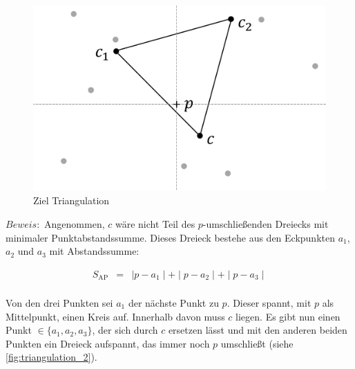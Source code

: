 \documentclass[a4paper]{extarticle}
\begin{document}
    \begin{figure}[!ht]
        \centering	
        \includegraphics[scale=0.10]{bilder/tri_1.pdf}
        \caption{Ziel Triangulation}
        \label{fig:triangulation_1}
    \end{figure}

    $Beweis:$
    Angenommen, $c$ wäre nicht Teil des $p$-umschließenden Dreiecks mit minimaler Punktabstandssumme.
    Dieses Dreieck bestehe aus den Eckpunkten $a_1$, $a_2$ und $a_3$ mit Abstandssumme:

    \begin{eqnarray*}
        S_{\text{AP}} &=& \mid p - a_1 \mid + \mid p - a_2 \mid + \mid p - a_3 \mid \\
    \end{eqnarray*}
    
    Von den drei Punkten sei $a_1$ der nächste Punkt zu $p$. Dieser spannt, mit $p$ als Mittelpunkt, 
    einen Kreis auf. Innerhalb davon muss $c$ liegen.
    Es gibt nun einen Punkt $\in \{ a_1, a_2, a_3 \}$, der sich durch $c$ ersetzen lässt und
    mit den anderen beiden Punkten ein Dreieck aufspannt, das immer noch $p$ umschließt 
    (siehe \ref{fig:triangulation_2}).
\end{document}

